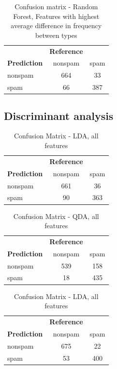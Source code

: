 \documentclass{article}\usepackage[]{graphicx}\usepackage[]{xcolor}
\begin{document}
\begin{table}[h]
    \centering
    \begin{tabular}{lcc}
        & \textbf{Reference} & \\
        \textbf{Prediction} & nonspam & spam \\
        nonspam & 664 & 33 \\
        spam & 66 & 387 \\
    \end{tabular}
    \caption{Confusion matrix - Random Forest, Features with highest average difference in frequency between types}
    \label{RFcm5}
\end{table}
\subsection*{Discriminant analysis}
\begin{table}[h]
	\centering
	\begin{tabular}{lcc}
		& \textbf{Reference} & \\
		\textbf{Prediction} & nonspam & spam \\
		nonspam & 661 & 36 \\
		spam & 90 & 363 \\
	\end{tabular}
	\caption{Confusion Matrix - LDA, all features}
	\label{tab:confusion_matrix_lda1}
\end{table}

\begin{table}[h]
	\centering
	\begin{tabular}{lcc}
		& \textbf{Reference} & \\
		\textbf{Prediction} & nonspam & spam \\
		nonspam & 539 & 158 \\
		spam & 18 & 435 \\
	\end{tabular}
	\caption{Confusion Matrix - QDA, all features}
	\label{tab:confusion_matrix_qda1}
\end{table}
\begin{table}[h]
	\centering
	\begin{tabular}{lcc}
		& \textbf{Reference} & \\
		\textbf{Prediction} & nonspam & spam \\
		nonspam & 675 & 22 \\
		spam & 53 & 400 \\
	\end{tabular}
	\caption{Confusion Matrix - LDA, all features}
	\label{tab:confusion_matrix_lda1_log}
\end{table}
\end{document}
